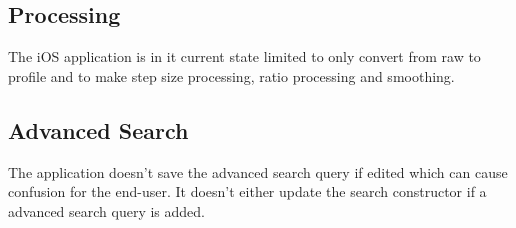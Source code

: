 


\subsection{Processing}
The iOS application is in it current state limited to only convert from raw to profile and to make step size processing, ratio processing and smoothing. 

\subsection{Advanced Search}
The application doesn't save the advanced search query if edited which can cause confusion for the end-user. It doesn't either update the search constructor if a advanced search query is added.  

